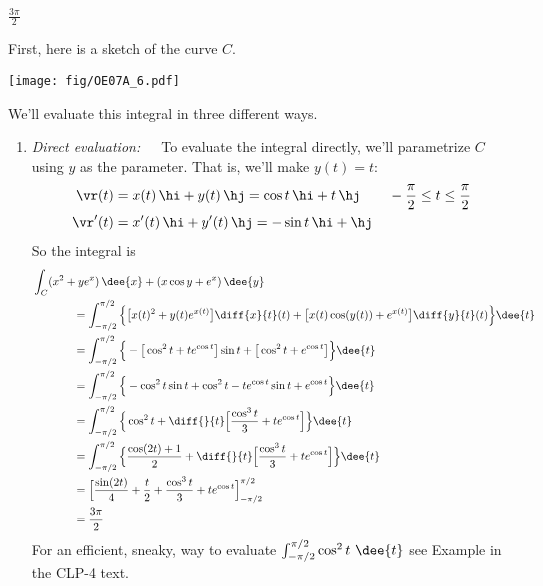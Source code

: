 \begin{answer}
$\frac{3\pi}{2}$
\end{answer}

\begin{solution}
First, here is a sketch of the curve $C$.

     \begin{center}
          \texttt{[image: fig/OE07A\_6.pdf]}
     \end{center}


We'll evaluate this integral in three different ways.
\begin{enumerate}[(1)]
\item \emph{Direct evaluation:}\ \ \ To evaluate the integral directly,
we'll parametrize $C$ using $y$ as the parameter. That is, we'll make $y(t)=t$:
\begin{align*}
\vr(t) &= x(t)\,\hi+y(t)\,\hj
        = \cos t\,\hi + t\,\hj\qquad -\frac{\pi}{2}\le t\le\frac{\pi}{2} \\
\vr'(t) &= x'(t)\,\hi+y'(t)\,\hj
        = -\sin t\,\hi + \hj
\end{align*}
So the integral is
\begin{align*}
&\int_C (x^2 + y e^x ) \,\dee{x} + (x \cos y + e^x ) \,\dee{y} \\
&\hskip0.5in
  =\int_{-\pi/2}^{\pi/2}\Big\{ \big[x(t)^2 +y(t) e^{x(t)}\big]\diff{x}{t}(t)
                        +  \big[x(t) \cos(y(t)) + e^{x(t)}\big]\diff{y}{t}(t)
                        \Big\}\dee{t} \\
&\hskip0.5in
  =\int_{-\pi/2}^{\pi/2}\Big\{ -\big[\cos^2 t + t e^{\cos t}\big]\sin t
                           +  \big[\cos^2 t + e^{\cos t}\big]
                        \Big\}\dee{t} \\
&\hskip0.5in
  =\int_{-\pi/2}^{\pi/2}\Big\{ -\cos^2 t\sin t +\cos^2 t
                      - t e^{\cos t}\sin t + e^{\cos t}
                        \Big\}\dee{t} \\
&\hskip0.5in
  =\int_{-\pi/2}^{\pi/2}\Big\{ \cos^2 t
                  +\diff{\hfill}{t}\Big[\frac{\cos^3 t}{3} +te^{\cos t}\Big]
                        \Big\}\dee{t} \\
&\hskip0.5in
  =\int_{-\pi/2}^{\pi/2}\Big\{ \frac{\cos(2t)+1}{2}
                  +\diff{\hfill}{t}\Big[\frac{\cos^3 t}{3} +te^{\cos t}\Big]
                        \Big\}\dee{t} \\
&\hskip0.5in
  =\Big[ \frac{\sin(2t)}{4} +\frac{t}{2}+
                  \frac{\cos^3 t}{3} +te^{\cos t}
                        \Big]_{-\pi/2}^{\pi/2} \\
&\hskip0.5in
  =\frac{3\pi}{2}
\end{align*}
For an efficient, sneaky, way to evaluate
$\int_{-\pi/2}^{\pi/2} \cos^2 t\ \dee{t}$ see Example
 in the CLP-4 text.


\end{enumerate}
\end{solution}
